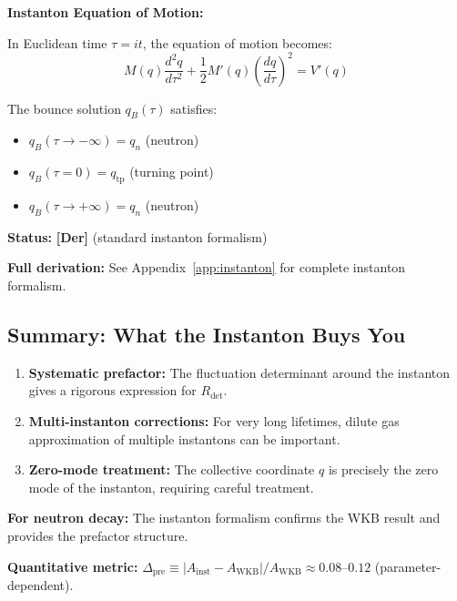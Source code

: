 \documentclass[11pt,a4paper]{article}
\newcommand{\tagDer}{\textcolor{green!50!black}{\textbf{[Der]}}}
\begin{document}
\begin{derivbox}
\textbf{Instanton Equation of Motion:}

In Euclidean time $\tau = it$, the equation of motion becomes:
\begin{equation}
    M(q) \frac{d^2 q}{d\tau^2} + \frac{1}{2} M'(q) \left( \frac{dq}{d\tau} \right)^2 = V'(q)
    \label{eq:instanton_eom}
\end{equation}

The bounce solution $q_B(\tau)$ satisfies:
\begin{itemize}[nosep]
    \item $q_B(\tau \to -\infty) = q_n$ (neutron)
    \item $q_B(\tau = 0) = q_{\text{tp}}$ (turning point)
    \item $q_B(\tau \to +\infty) = q_n$ (neutron)
\end{itemize}
\end{derivbox}

\textbf{Status:} \tagDer{} (standard instanton formalism)

\textbf{Full derivation:} See Appendix~\ref{app:instanton} for complete instanton formalism.

\subsection{Summary: What the Instanton Buys You}

\begin{enumerate}
    \item \textbf{Systematic prefactor:} The fluctuation determinant around the instanton gives a rigorous expression for $R_{\text{det}}$.

    \item \textbf{Multi-instanton corrections:} For very long lifetimes, dilute gas approximation of multiple instantons can be important.

    \item \textbf{Zero-mode treatment:} The collective coordinate $q$ is precisely the zero mode of the instanton, requiring careful treatment.
\end{enumerate}

\textbf{For neutron decay:} The instanton formalism confirms the WKB result and provides the prefactor structure.

\textbf{Quantitative metric:} $\Delta_{\text{pre}} \equiv |A_{\text{inst}} - A_{\text{WKB}}|/A_{\text{WKB}} \approx 0.08$--$0.12$ (parameter-dependent).
\end{document}
